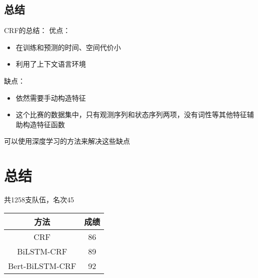 \documentclass[9pt,aspectratio=169]{ctexbeamer}
\begin{document}
	\subsection{总结}
	\begin{frame}
		CRF的总结：
		优点：
		\begin{itemize}
			\item 在训练和预测的时间、空间代价小
			\item 利用了上下文语言环境
		\end{itemize}
		缺点：
		\begin{itemize}
			\item 依然需要手动构造特征
			\item 这个比赛的数据集中，只有观测序列和状态序列两项，没有词性等其他特征辅助构造特征函数
		\end{itemize}
		可以使用深度学习的方法来解决这些缺点
	\end{frame}
	
%

	\section{总结}
	\begin{frame}
		共1258支队伍，名次45
		\begin{table}[]
			\begin{tabular}{cc}
				\hline
				方法               & 成绩   \\
				\hline
				CRF         & 86 \\
				BiLSTM-CRF         & 89               \\
				Bert-BiLSTM-CRF          & 92                              \\
				\hline
				
			\end{tabular}
		\end{table}
	\end{frame}
\end{document}
